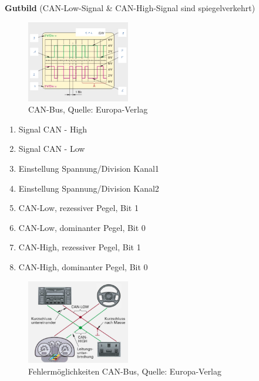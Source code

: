 \textbf{Gutbild} (CAN-Low-Signal \& CAN-High-Signal sind
spiegelverkehrt)

\begin{figure}[!ht]%
\centering
\includegraphics[width=0.4\textwidth]{images/CAN-Bus/CAN-Bus-4.pdf}
\caption{CAN-Bus, Quelle: Europa-Verlag}
\end{figure}

\begin{enumerate}
\item
  Signal CAN - High
\item
  Signal CAN - Low
\item
  Einstellung Spannung/Division Kanal1
\item
  Einstellung Spannung/Division Kanal2
\item
  CAN-Low, rezessiver Pegel, Bit 1
\item
  CAN-Low, dominanter Pegel, Bit 0
\item
  CAN-High, rezessiver Pegel, Bit 1
\item
  CAN-High, dominanter Pegel, Bit 0
\end{enumerate}

\begin{figure}[!ht]%
\centering
\includegraphics[width=0.4\textwidth]{images/CAN-Bus/CAN-Bus-10.pdf}
\caption{Fehlermöglichkeiten CAN-Bus, Quelle: Europa-Verlag}
\end{figure}

